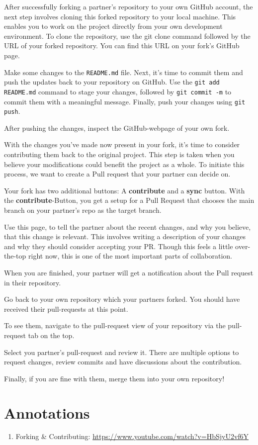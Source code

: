 \documentclass{dcbl/challenge}
\begin{document}
\begin{aufgabe}
    After successfully forking a partner's repository to your own GitHub account, the next step involves cloning this forked repository to your local machine. This enables you to work on the project directly from your own development environment. To clone the repository, use the git clone command followed by the URL of your forked repository. You can find this URL on your fork's GitHub page.
    
    Make some changes to the \texttt{README.md} file. Next, it's time to commit them and push the updates back to your repository on GitHub. Use the \texttt{git add README.md} command to stage your changes, followed by  \texttt{git commit -m} to commit them with a meaningful message. Finally, push your changes using \texttt{git push}. 
    
    After pushing the changes, inspect the GitHub-webpage of your own fork.
\end{aufgabe}

\begin{aufgabe}
    With the changes you've made now present in your fork, it's time to consider contributing them back to the original project. This step is taken when you believe your modifications could benefit the project as a whole. To initiate this process, we want to create a Pull request that your partner can decide on.
    
    Your fork has two additional buttons: A \textbf{contribute} and a \textbf{sync} button. With the \textbf{contribute}-Button, you get a setup for a Pull Request that chooses the main branch on your partner's repo as the target branch.
    
    Use this page, to tell the partner about the recent changes, and why you believe, that this change is relevant. This involves writing a description of your changes and why they should consider accepting your PR. Though this feels a little over-the-top right now, this is one of the most important parts of collaboration.
    
    When you are finished, your partner will get a notification about the Pull request in their repository. 
\end{aufgabe}

\begin{aufgabe}
    Go back to your own repository which your partners forked. You should have received their pull-requests at this point.
    
    To see them, navigate to the pull-request view of your repository via the pull-request tab on the top. 

    Select you partner's pull-request and review it. There are multiple options to request changes, review commits and have discussions about the contribution.
    
    Finally, if you are fine with them, merge them into your own repository!
\end{aufgabe}

\section*{Annotations}
\begin{enumerate}
    \item Forking \& Contributing: \url{https://www.youtube.com/watch?v=HbSjyU2vf6Y}
\end{enumerate}
\end{document}
